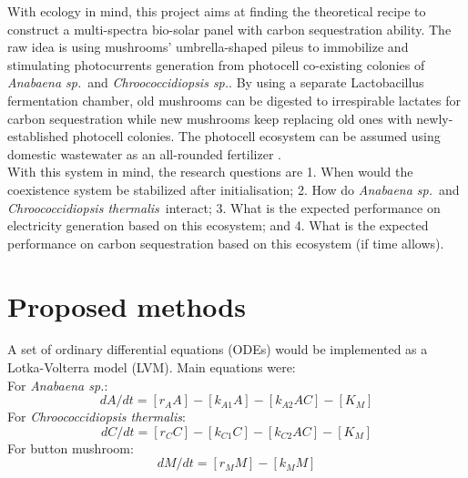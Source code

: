 \documentclass[a4paper, 11pt]{article}
\newcommand{\As}{\textit{Anabaena sp.}}
\newcommand{\Ct}{\textit{Chroococcidiopsis thermalis}}
\newcommand{\Cs}{\textit{Chroococcidiopsis sp.}}
\begin{document}
With ecology in mind, this project aims at finding the theoretical recipe to construct a multi-spectra bio-solar panel with carbon sequestration ability.  The raw idea is using mushrooms' umbrella-shaped pileus to immobilize and stimulating photocurrents generation from photocell co-existing colonies of \As\ and \Cs.  By using a separate Lactobacillus fermentation chamber, old mushrooms can be digested to irrespirable lactates \autocite{senthuran1997lactic} for carbon sequestration while new mushrooms keep replacing old ones with newly-established photocell colonies.  The photocell ecosystem can be assumed using domestic wastewater as an all-rounded fertilizer \autocite{markou2014microalgal}.\\

With this system in mind, the research questions are 1. When would the coexistence system be stabilized after initialisation; 2. How do \As\ and \Ct\ interact; 3. What is the expected performance on electricity generation based on this ecosystem; and 4. What is the expected performance on carbon sequestration based on this ecosystem (if time allows).

\section{Proposed methods}
A set of ordinary differential equations (ODEs) would be implemented as a Lotka-Volterra model (LVM).  Main equations were:\\
For \As:
\begin{equation}
	dA/dt = [r_A A] - [k_{A1} A] - [k_{A2} A C] - [K_M]
\end{equation}
For \Ct:
\begin{equation}
	dC/dt = [r_C C] - [k_{C1} C] - [k_{C2} A C] - [K_M]
\end{equation}
For button mushroom:
\begin{equation}
	dM/dt = [r_M M] - [k_M M]
\end{equation}
\end{document}
